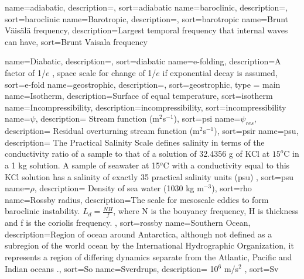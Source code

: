{
name={adiabatic},
description={},
sort=adiabatic
}
{
name={baroclinic},
description={},
sort=baroclinic
}
{
name={Barotropic},
description={},
sort=barotropic
}
{
name={Brunt V{\"a}is\"al\"a  frequency},
description={Largest temporal frequency that internal waves can have},
sort=Brunt Vaisala frequency
}

{
name={Diabatic},
description={},
sort=diabatic
}
{
name={e-folding},
description={A factor of 1/$e$ , space scale for change of 1/$e$ if exponential decay is assumed},
sort=e-fold
}
{
name={geostrophic},
description={},
sort=geostrophic,
type = main
}
{
name={Isotherm},
description={Surface of equal temperature},
sort=isotherm
}
{
name={Incompressibility},
description={incompressibility},
sort=incompressibility
}
{
name={$\ensuremath{\psi}$},
description={ Stream function (m$^{2}$s$^{-1}$)},
sort=psi
}
{
name={$\ensuremath{\psi_{res}}$},
description={ Residual overturning stream function (m$^{2}$s$^{-1}$)},
sort=psir
}
{
  name={psu},
  description={ The Practical Salinity Scale defines salinity in terms of the conductivity ratio of a sample to that of a solution of 32.4356 g of KCl at $15^{o}$C in a 1 kg solution. A sample of seawater at 15$^{o}$C with a conductivity equal to this KCl solution has a salinity of exactly 35 practical salinity units (psu)           },
  sort=psu
}
{
name={$\ensuremath{\rho}$},
description={ Density of sea water (1030 kg m$^{-3}$)},
sort=rho
}
{
name={Rossby radius},
description={The scale for mesoscale eddies to form baroclinic instability. $\displaystyle {L_d = \frac{NH}{f}}$, where N is the bouyancy frequency, H is thickness and f is the coriolis frequency.  },
sort=rossby
}
{
  name={Southern Ocean},
  description={Region of ocean around Antarctica, although not defined as a subregion of the world ocean by the International Hydrographic Organization, it represents a region of differing dynamics separate from the Atlantic, Pacific and Indian oceans \citep{tomczak2003}.},
  sort=So
}
{
  name={Sverdrups},
  description={ 10$^{6}$ m/s$^{2}$                 },
  sort=Sv
}


%








